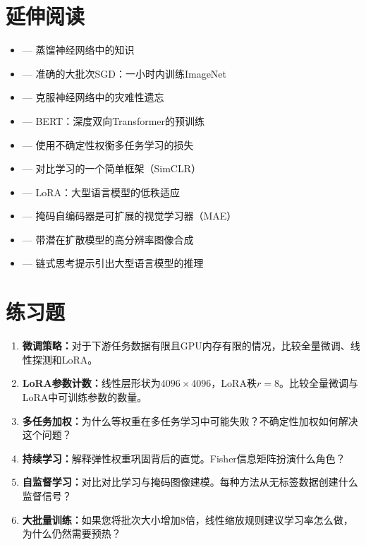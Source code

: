 \section{延伸阅读}

\begin{itemize}
    \item \cite{hinton2015distilling} --- 蒸馏神经网络中的知识
    \item \cite{goyal2017accurate} --- 准确的大批次SGD：一小时内训练ImageNet
    \item \cite{kirkpatrick2017overcoming} --- 克服神经网络中的灾难性遗忘
    \item \cite{devlin2018bert} --- BERT：深度双向Transformer的预训练
    \item \cite{kendall2018multi} --- 使用不确定性权衡多任务学习的损失
    \item \cite{chen2020simple} --- 对比学习的一个简单框架（SimCLR）
    \item \cite{hu2021lora} --- LoRA：大型语言模型的低秩适应
    \item \cite{he2022masked} --- 掩码自编码器是可扩展的视觉学习器（MAE）
    \item \cite{rombach2022high} --- 带潜在扩散模型的高分辨率图像合成
    \item \cite{wei2022regard} --- 链式思考提示引出大型语言模型的推理
\end{itemize}

\section{练习题}

\begin{enumerate}
    \item \textbf{微调策略：}对于下游任务数据有限且GPU内存有限的情况，比较全量微调、线性探测和LoRA。

    \item \textbf{LoRA参数计数：}线性层形状为$4096 \times 4096$，LoRA秩$r=8$。比较全量微调与LoRA中可训练参数的数量。

    \item \textbf{多任务加权：}为什么等权重在多任务学习中可能失败？不确定性加权如何解决这个问题？

    \item \textbf{持续学习：}解释弹性权重巩固背后的直觉。Fisher信息矩阵扮演什么角色？

    \item \textbf{自监督学习：}对比对比学习与掩码图像建模。每种方法从无标签数据创建什么监督信号？

    \item \textbf{大批量训练：}如果您将批次大小增加8倍，线性缩放规则建议学习率怎么做，为什么仍然需要预热？
\end{enumerate}

